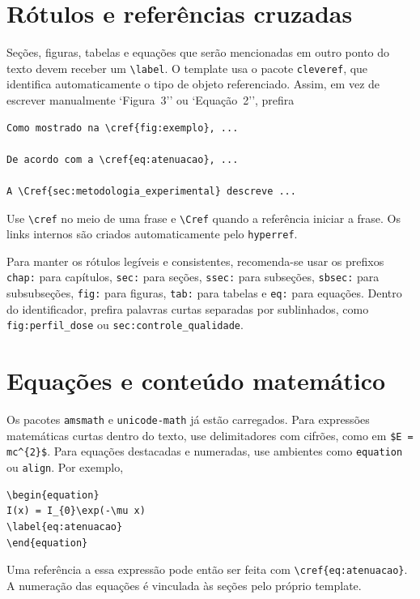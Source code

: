 \section{Rótulos e referências cruzadas}
\label{sec:rotulos_referencias}

Seções, figuras, tabelas e equações que serão mencionadas em outro ponto do texto devem receber um \verb|\label|. O template usa o pacote \verb|cleveref|, que identifica automaticamente o tipo de objeto referenciado. Assim, em vez de escrever manualmente `Figura~3'' ou `Equação~2'', prefira

\begin{verbatim}
Como mostrado na \cref{fig:exemplo}, ...

De acordo com a \cref{eq:atenuacao}, ...

A \Cref{sec:metodologia_experimental} descreve ...
\end{verbatim}

Use \verb|\cref| no meio de uma frase e \verb|\Cref| quando a referência iniciar a frase. Os links internos são criados automaticamente pelo \verb|hyperref|.

Para manter os rótulos legíveis e consistentes, recomenda-se usar os prefixos \verb|chap:| para capítulos, \verb|sec:| para seções, \verb|ssec:| para subseções, \verb|sbsec:| para subsubseções, \verb|fig:| para figuras, \verb|tab:| para tabelas e \verb|eq:| para equações. Dentro do identificador, prefira palavras curtas separadas por sublinhados, como \verb|fig:perfil_dose| ou \verb|sec:controle_qualidade|.

\section{Equações e conteúdo matemático}
\label{sec:equacoes_matematica}

Os pacotes \verb|amsmath| e \verb|unicode-math| já estão carregados. Para expressões matemáticas curtas dentro do texto, use delimitadores com cifrões, como em \verb|$E = mc^{2}$|. Para equações destacadas e numeradas, use ambientes como \verb|equation| ou \verb|align|. Por exemplo,

\begin{verbatim}
\begin{equation}
I(x) = I_{0}\exp(-\mu x)
\label{eq:atenuacao}
\end{equation}
\end{verbatim}

Uma referência a essa expressão pode então ser feita com \verb|\cref{eq:atenuacao}|. A numeração das equações é vinculada às seções pelo próprio template.

